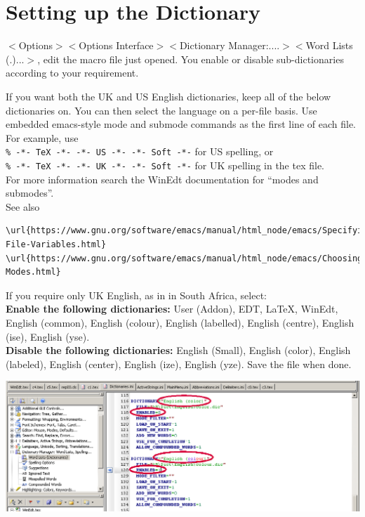 

\section{Setting up the Dictionary}
$<$Options$>$$<$Options Interface$>$$<$Dictionary Manager:....$>$$<$Word Lists (.)...$>$, edit the macro file just opened.  You enable or disable
sub-dictionaries according to your requirement.


If you want both the UK and US English dictionaries, keep all of the below dictionaries on. You can then select the language on a per-file basis.
Use embedded emacs-style mode and submode commands as the first line of each file. For example, use\\
\verb"% -*- TeX -*- -*- US -*- -*- Soft -*-" for US spelling, or\\
\verb"% -*- TeX -*- -*- UK -*- -*- Soft -*-" for UK spelling in the tex file.\\
For more information search the WinEdt documentation for ``modes and submodes''.\\
See also
\begin{lstlisting}
\url{https://www.gnu.org/software/emacs/manual/html_node/emacs/Specifying-File-Variables.html}
\url{https://www.gnu.org/software/emacs/manual/html_node/emacs/Choosing-Modes.html}
\end{lstlisting}


If you require only UK English, as in in South Africa, select:\\
\textbf{Enable the following dictionaries:} User (Addon), EDT, LaTeX, WinEdt, English (common),  English (colour),  English (labelled),  English (centre), English (ise),  English  (yse).\\
\textbf{Disable the following dictionaries:}  English (Small), English (color), English (labeled), English (center), English (ize), English (yze).
Save the file when done.

\centerline{\includegraphics[bb= 0 0 1047 386, width=\textwidth]{eps/dictionary.png}}



